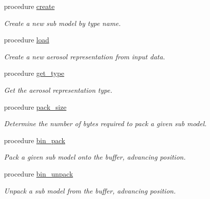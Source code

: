 \begin{DoxyCompactItemize}
\item 
procedure \mbox{\hyperlink{structpmc__sub__model__factory_1_1sub__model__factory__t_a7f69d7e54198993ee60b24f5ef6be397}{create}}
\begin{DoxyCompactList}\small\item\em Create a new sub model by type name. \end{DoxyCompactList}\item 
procedure \mbox{\hyperlink{structpmc__sub__model__factory_1_1sub__model__factory__t_a39f57fd063baaa783f5be50e938fbd77}{load}}
\begin{DoxyCompactList}\small\item\em Create a new aerosol representation from input data. \end{DoxyCompactList}\item 
procedure \mbox{\hyperlink{structpmc__sub__model__factory_1_1sub__model__factory__t_a54e0528e33649e90054053c25ee003a4}{get\+\_\+type}}
\begin{DoxyCompactList}\small\item\em Get the aerosol representation type. \end{DoxyCompactList}\item 
procedure \mbox{\hyperlink{structpmc__sub__model__factory_1_1sub__model__factory__t_ae906b80cce356515aaad7a968a6270dc}{pack\+\_\+size}}
\begin{DoxyCompactList}\small\item\em Determine the number of bytes required to pack a given sub model. \end{DoxyCompactList}\item 
procedure \mbox{\hyperlink{structpmc__sub__model__factory_1_1sub__model__factory__t_a2ac31420763e0f35416e05a010138f2c}{bin\+\_\+pack}}
\begin{DoxyCompactList}\small\item\em Pack a given sub model onto the buffer, advancing position. \end{DoxyCompactList}\item 
procedure \mbox{\hyperlink{structpmc__sub__model__factory_1_1sub__model__factory__t_a538da2e602cf76864e9a5c2bc3951547}{bin\+\_\+unpack}}
\begin{DoxyCompactList}\small\item\em Unpack a sub model from the buffer, advancing position. \end{DoxyCompactList}\end{DoxyCompactItemize}


